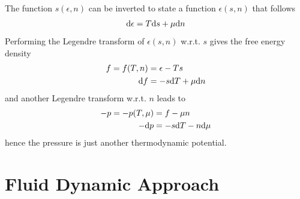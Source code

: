 The function $s(\epsilon,n)$ can be inverted to state a function $\epsilon(s,n)$ that follows
\begin{equation}
    \text{d}\epsilon=T\text{d} s+\mu\text{d} n
\end{equation}
Performing the Legendre transform of $\epsilon(s,n)$ w.r.t. $s$ gives the free energy density
\begin{subequations}
    \begin{align}
        f=f(T,n) & =\epsilon-Ts      \\
        \text{d} f    & =-s\text{d} T+\mu\text{d} n
    \end{align}
\end{subequations}
and another Legendre transform w.r.t. $n$ leads to
\begin{subequations}
    \begin{align}
        -p=-p(T,\mu) & =f-\mu n         \\
        -\text{d} p       & =-s\text{d} T-n\text{d}\mu
    \end{align}
\end{subequations}
hence the pressure is just another thermodynamic potential.

\section{Fluid Dynamic Approach}

